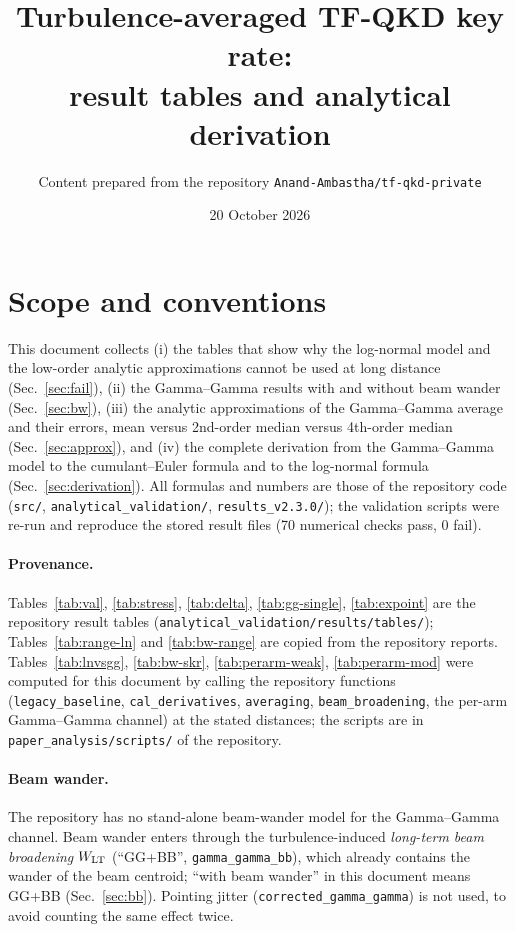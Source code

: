 \documentclass[11pt,a4paper]{article}
\title{Turbulence-averaged TF-QKD key rate:\\ result tables and analytical derivation}
\author{Content prepared from the repository \texttt{Anand-Ambastha/tf-qkd-private}}
\date{20 October 2026}
\theoremstyle{plain}
\theoremstyle{remark}
\begin{document}
\maketitle

\section{Scope and conventions}
This document collects (i) the tables that show why the log-normal model and the low-order analytic approximations cannot be used at long distance (Sec.~\ref{sec:fail}), (ii) the Gamma--Gamma results with and without beam wander (Sec.~\ref{sec:bw}), (iii) the analytic approximations of the Gamma--Gamma average and their errors, mean versus 2nd-order median versus 4th-order median (Sec.~\ref{sec:approx}), and (iv) the complete derivation from the Gamma--Gamma model to the cumulant--Euler formula and to the log-normal formula (Sec.~\ref{sec:derivation}). All formulas and numbers are those of the repository code (\texttt{src/}, \texttt{analytical\_validation/}, \texttt{results\_v2.3.0/}); the validation scripts were re-run and reproduce the stored result files (70 numerical checks pass, 0 fail).

\paragraph{Provenance.} Tables~\ref{tab:val}, \ref{tab:stress}, \ref{tab:delta}, \ref{tab:gg-single}, \ref{tab:expoint} are the repository result tables (\texttt{analytical\_validation/results/tables/}); Tables~\ref{tab:range-ln} and \ref{tab:bw-range} are copied from the repository reports. Tables~\ref{tab:lnvsgg}, \ref{tab:bw-skr}, \ref{tab:perarm-weak}, \ref{tab:perarm-mod} were computed for this document by calling the repository functions (\texttt{legacy\_baseline}, \texttt{cal\_derivatives}, \texttt{averaging}, \texttt{beam\_broadening}, the per-arm Gamma--Gamma channel) at the stated distances; the scripts are in \texttt{paper\_analysis/scripts/} of the repository.

\paragraph{Beam wander.} The repository has no stand-alone beam-wander model for the Gamma--Gamma channel. Beam wander enters through the turbulence-induced \emph{long-term beam broadening} $W_{\rm LT}$ (``GG+BB'', \texttt{gamma\_gamma\_bb}), which already contains the wander of the beam centroid; ``with beam wander'' in this document means GG+BB (Sec.~\ref{sec:bb}). Pointing jitter (\texttt{corrected\_gamma\_gamma}) is not used, to avoid counting the same effect twice.
\end{document}
